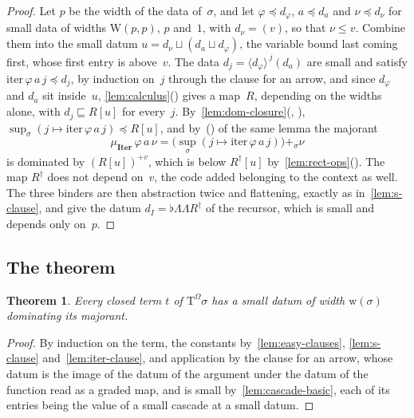 \documentclass[11pt]{amsart}
\makeatletter
\newcommand{\TmO}{\mathrm{T}^{\Omega}}
\newcommand{\iterop}{\mathrm{iter}}
\newcommand{\Iterc}{\mathbf{Iter}}
\newcommand{\bplus}{\mathbin{+}}
\newcommand{\Mj}{\mu}                         %
\newcommand{\dwd}{\mathrm{w}}
\newcommand{\W}{\mathrm{W}}
\newcommand{\tle}{\mathrel{\sqsubseteq}}      %
\newcommand{\dom}{\mathrel{\preccurlyeq}}     %
\newcommand{\act}[2]{#1[#2]}                  %
\newcommand{\rd}[1]{\langle #1 \rangle}       %
\newif\ifagdarefs
\newcommand{\AgdaRefs}[1]{\ifagdarefs{\footnotesize\color{agdablue}(#1)}\else\unskip\fi}
\newcommand{\Agda}[2]{{\footnotesize\color{agdablue}\textsf{#1}%
  \ifblank{#2}{}{\texttt{.}\allowbreak\texttt{#2}}}}
\let\ttt@plain\texttt
\renewcommand{\texttt}[1]{{\footnotesize\color{agdablue}\ttt@plain{#1}}}
\theoremstyle{plain}
\newtheorem{theorem}{Theorem}[section]
\theoremstyle{definition}
\makeatother
\begin{document}
\begin{proof}
Let $p$ be the width of the data of~$\sigma$, and let
$\varphi \dom d_\varphi$, $a \dom d_a$ and $\nu \dom d_\nu$ for small
data of widths $\W(p,p)$, $p$ and~$1$, with $d_\nu = (v)$, so that
$\nu \le v$. Combine them into the small datum
$u = d_\nu \sqcup (d_a \sqcup d_\varphi)$, the variable bound last
coming first, whose first entry is above~$v$. The data
$d_j = \rd{d_\varphi}^{\,j}(d_a)$ are small and satisfy
$\iterop\,\varphi\,a\,j \dom d_j$, by induction on~$j$ through the
clause for an arrow, and since $d_\varphi$ and $d_a$ sit inside~$u$,
\cref{lem:calculus}() gives a map~$R$, depending
on the widths alone, with $d_j \tle \act R u$ for every~$j$.
By~\cref{lem:dom-closure}(,%
),
$\sup_{\sigma}(j \mapsto \iterop\,\varphi\,a\,j) \dom \act R u$, and
by~() of the same lemma the majorant
\[
  \Mj_{\Iterc}\,\varphi\,a\,\nu
  = \big(\textstyle\sup_{\sigma}(j \mapsto \iterop\,\varphi\,a\,j)\big)
    \bplus_{\sigma} \nu
\]
is dominated by $(\act R u)^{+v}$, which is below
$\act{R^{\dagger}}{u}$ by~\cref{lem:rect-ops}().
The map $R^{\dagger}$ does not depend on~$v$, the code added belonging
to the context as well. The three binders are then abstraction twice
and flattening, exactly as in~\cref{lem:s-clause}, and give the datum
$d_I = \flat\Lambda\Lambda R^{\dagger}$ of the recursor, which is
small and depends only on~$p$.
\end{proof}

\subsection{The theorem}
\label{sec:theorem}

\begin{theorem}
\label{thm:fundamental}
Every closed term $t$ of $\TmO\sigma$ has a small datum of width
$\dwd(\sigma)$ dominating its majorant.
\AgdaRefs{\Agda{DialogueTrees.Fundamental}{fundamental}.}
\end{theorem}

\begin{proof}
By induction on the term, the constants by~\cref{lem:easy-clauses},
\cref{lem:s-clause} and~\cref{lem:iter-clause}, and application by the
clause for an arrow, whose datum is the image of the datum of the
argument under the datum of the function read as a graded map, and is
small by~\cref{lem:cascade-basic}, each of its entries being the value
of a small cascade at a small datum.
\end{proof}
\end{document}
